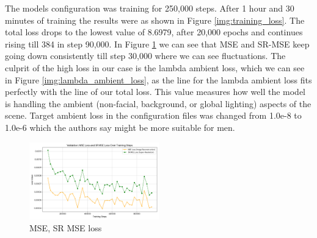 \documentclass[12pt]{article}
\begin{document}
The models configuration was training for 250,000 steps. After 1 hour and 30 minutes of training the results were as shown in Figure \ref{img:training_loss}. The total loss drops to the lowest value of 8.6979, after 20,000 epochs and continues rising till 384 in step 90,000. In Figure \ref{img:mse_sr_mse_loss} we can see that MSE and SR-MSE keep going down consistently till step 30,000 where we can see fluctuations. The culprit of the high loss in our case is the lambda ambient loss, which we can see in Figure \ref{img:lambda_ambient_loss}, as the line for the lambda ambient loss fits perfectly with the line of our total loss. This value measures how well the model is handling the ambient (non-facial, background, or global lighting) aspects of the scene. Target ambient loss in the configuration files was changed from 1.0e-8 to 1.0e-6 which the authors say might be more suitable for men. 

\begin{figure}[h!]
    \centering
    \includegraphics[width=0.5\textwidth]{images/mse_sr_mse_loss.png}
    \caption{MSE, SR MSE loss}
    \label{img:mse_sr_mse_loss}
\end{figure}
\end{document}
